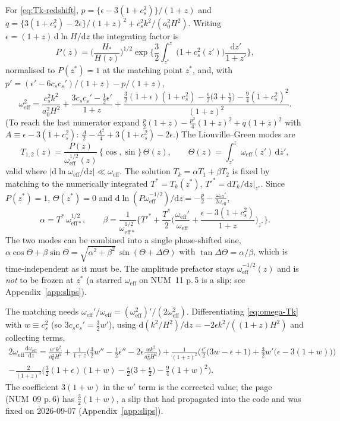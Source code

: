 \documentclass[11pt,a4paper]{article}
\newcommand{\dd}{\mathrm{d}}
\newcommand{\om}{\omega_{\mathrm{eff}}}
\newcommand{\omstar}{\omega_{\mathrm{eff}*}}
\newcommand{\eps}{\epsilon}
\newcommand{\note}[1]{\textsf{#1}}
\theoremstyle{remark}
\begin{document}
For \eqref{eq:Tk-redshift}, $p = \{\eps-3(1+c_s^2)\}/(1+z)$ and $q = \{3(1+c_s^2)-2\eps\}/(1+z)^2 + c_s^2k^2/(a_0^2H^2)$. Writing $\eps = (1+z)\,\dd\ln H/\dd z$ the integrating factor is
\begin{equation}
P(z) = \Big(\frac{H_*}{H(z)}\Big)^{1/2}\exp\Big\{\frac32\int_{z^*}^{z}\big(1+c_s^2(z')\big)\frac{\dd z'}{1+z'}\Big\},
\label{eq:P-Tk}
\end{equation}
normalised to $P(z^*)=1$ at the matching point $z^*$, and, with $p' = (\eps'-6c_sc_s')/(1+z) - p/(1+z)$,
\begin{equation}
\boxed{\;
\om^2 = \frac{c_s^2k^2}{a_0^2H^2} + \frac{3c_sc_s' - \tfrac12\eps'}{1+z}
+ \frac{\tfrac32(1+\eps)(1+c_s^2) - \tfrac{\eps}{2}\big(3+\tfrac{\eps}{2}\big) - \tfrac94(1+c_s^2)^2}{(1+z)^2} .\;}
\label{eq:omega-Tk}
\end{equation}
(To reach the last numerator expand $\tfrac{p}{2}(1+z) - \tfrac{p^2}{4}(1+z)^2 + q(1+z)^2$ with $A\equiv\eps-3(1+c_s^2)$: $\tfrac A2 - \tfrac{A^2}{4} + 3(1+c_s^2) - 2\eps$.) The Liouville--Green modes are
\begin{equation}
T_{1,2}(z) = \frac{P(z)}{\om^{1/2}(z)}\,\{\cos,\sin\}\,\Theta(z),\qquad
\Theta(z) = \int_{z^*}^{z}\om(z')\,\dd z',
\label{eq:LG-modes-Tk}
\end{equation}
valid where $|\dd\ln\om/\dd z|\ll\om$. The solution $T_k = \alpha T_1 + \beta T_2$ is fixed by matching to the numerically integrated $T^* = T_k(z^*)$, $T'^* = \dd T_k/\dd z|_{z^*}$. Since $P(z^*)=1$, $\Theta(z^*)=0$ and $\dd\ln(P\om^{-1/2})/\dd z = -\tfrac p2 - \tfrac{\om'}{2\om}$,
\begin{equation}
\alpha = T^*\,\omstar^{1/2},\qquad
\beta = \frac{1}{\omstar^{1/2}}\Big\{T'^* + \frac{T^*}{2}\Big(\frac{\om'}{\om} + \frac{\eps-3(1+c_s^2)}{1+z}\Big)_{z^*}\Big\}.
\label{eq:matching-Tk}
\end{equation}
The two modes can be combined into a single phase-shifted sine, $\alpha\cos\Theta+\beta\sin\Theta = \sqrt{\alpha^2+\beta^2}\,\sin(\Theta+\Delta\Theta)$ with $\tan\Delta\Theta = \alpha/\beta$, which is time-independent as it must be. The amplitude prefactor stays $\om^{-1/2}(z)$ and is \emph{not} to be frozen at $z^*$ (a starred $\om$ on \note{NUM}~11 p.\,5 is a slip; see Appendix~\ref{app:slips}).

The matching needs $\om'/\om = (\om^2)'/(2\om^2)$. Differentiating \eqref{eq:omega-Tk} with $w\equiv c_s^2$ (so $3c_sc_s' = \tfrac32w'$), using $\dd(k^2/H^2)/\dd z = -2\eps k^2/((1+z)H^2)$ and collecting terms,
\begin{multline}
2\om\frac{\dd\om}{\dd z}
 = \frac{w'k^2}{a_0^2H^2}
 + \frac{1}{1+z}\Big(\frac32w'' - \frac12\eps'' - 2\eps\frac{wk^2}{a_0^2H^2}\Big)
 + \frac{1}{(1+z)^2}\Big(\frac{\eps'}{2}\big(3w-\eps+1\big) + \frac32w'\big(\eps-3(1+w)\big)\Big)\\
 - \frac{2}{(1+z)^3}\Big(\frac32(1+\eps)(1+w) - \frac{\eps}{2}\Big(3+\frac{\eps}{2}\Big) - \frac94(1+w)^2\Big).
\label{eq:domega-Tk}
\end{multline}
The coefficient $3(1+w)$ in the $w'$ term is the corrected value; the page (\note{NUM}~09 p.\,6) has $\tfrac32(1+w)$, a slip that had propagated into the code and was fixed on 2026-09-07 (Appendix~\ref{app:slips}).
\end{document}
